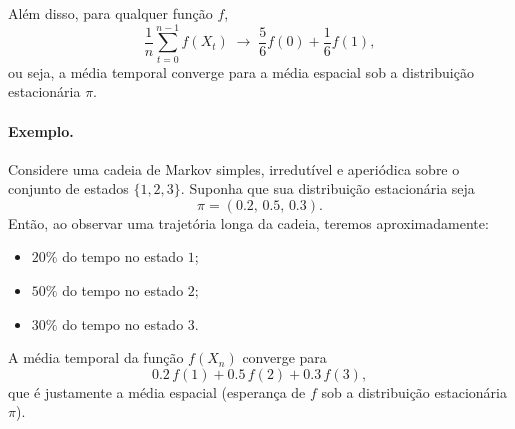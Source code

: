 \documentclass[12pt,letterpaper]{article}
\begin{document}
Além disso, para qualquer função \(f\),
\[
\frac{1}{n} \sum_{t=0}^{n-1} f(X_t)
\;\longrightarrow\;
\frac{5}{6} f(0) + \frac{1}{6} f(1),
\]
ou seja, a média temporal converge para a média espacial sob a
distribuição estacionária \(\pi\).


\paragraph{Exemplo.} 
Considere uma cadeia de Markov simples, irredutível e aperiódica sobre
o conjunto de estados \(\{1,2,3\}\).  Suponha que sua distribuição
estacionária seja
\[
\pi = (0.2,\, 0.5,\, 0.3).
\]
Então, ao observar uma trajetória longa da cadeia, teremos
aproximadamente:
\begin{itemize}
    \item \(20\%\) do tempo no estado \(1\);
    \item \(50\%\) do tempo no estado \(2\);
    \item \(30\%\) do tempo no estado \(3\).
\end{itemize}

A média temporal da função \(f(X_n)\) converge para
\[
  0.2\,f(1) + 0.5\,f(2) + 0.3\,f(3),
\]
que é justamente a média espacial (esperança de \(f\) sob a
distribuição estacionária \(\pi\)).


\bigskip
\end{document}
